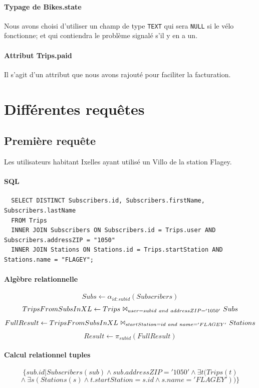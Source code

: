 \documentclass[a4paper]{article}
\begin{document}
  \paragraph{Typage de Bikes.state} Nous avons choisi d'utiliser un champ de type \texttt{TEXT} qui sera \texttt{NULL} si le vélo fonctionne; et qui contiendra le problème signalé s'il y en a un.

  \paragraph{Attribut Trips.paid} Il s'agit d'un attribut que nous avons rajouté pour faciliter la facturation.

\section{Différentes requêtes}



\subsection{Première requête}
    Les utilisateurs habitant Ixelles ayant utilisé un Villo de la station Flagey.

    \paragraph{SQL}
  \begin{verbatim}
  SELECT DISTINCT Subscribers.id, Subscribers.firstName, Subscribers.lastName
  FROM Trips
  INNER JOIN Subscribers ON Subscribers.id = Trips.user AND Subscribers.addressZIP = "1050"
  INNER JOIN Stations ON Stations.id = Trips.startStation AND Stations.name = "FLAGEY";
  \end{verbatim}
  
    \paragraph{Algèbre relationnelle}
    $$ Subs \leftarrow \alpha_{id:subid}(Subscribers)$$
    $$TripsFromSubsInXL \leftarrow Trips\ \Bowtie_{user=subid\ and\ addressZIP='1050'}\ Subs$$
    $$FullResult \leftarrow TripsFromSubsInXL\ \Bowtie_{startStation=id\ and\  name='FLAGEY'}\ Stations$$
    $$Result \leftarrow \pi_{subid}(FullResult)$$
    
    \paragraph{Calcul relationnel tuples}
    $$ \{sub.id | Subscribers(sub) \land sub.addressZIP='1050' \land \exists t (Trips(t)$$
    $$ \land\ \exists s (Stations(s) \land t.startStation=s.id \land s.name = 'FLAGEY'))  \} $$
\end{document}
